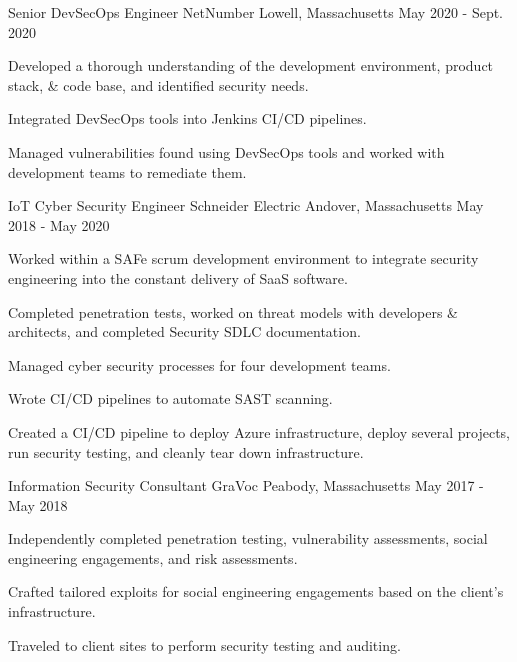 \begin{cventries}
  \cventry
    {Senior DevSecOps Engineer} %
    {NetNumber} %
    {Lowell, Massachusetts} %
    {May 2020 - Sept. 2020} %
    {
      \begin{cvitems} %
        \item {
            Developed a thorough understanding of the development environment, product stack, \& code base, and identified security needs.
        }
        \item {
            Integrated DevSecOps tools into Jenkins CI/CD pipelines.
        }
        \item {
            Managed vulnerabilities found using DevSecOps tools and worked with development teams to remediate them.
        }
      \end{cvitems}
    }

  \cventry
    {IoT Cyber Security Engineer} %
    {Schneider Electric} %
    {Andover, Massachusetts} %
    {May 2018 - May 2020} %
    {
      \begin{cvitems} %
        \item {
            Worked within a SAFe scrum development environment to integrate security engineering into the constant delivery of SaaS software.
        }
        \item {
            Completed penetration tests, worked on threat models with developers \& architects, and completed Security SDLC documentation.
        }
        \item {
            Managed cyber security processes for four development teams.
        }
        \item {
            Wrote CI/CD pipelines to automate SAST scanning.
        }
        \item {
            Created a CI/CD pipeline to deploy Azure infrastructure, deploy several projects, run security testing, and cleanly tear down infrastructure.
        }
      \end{cvitems}
    }

  \cventry
    {Information Security Consultant} %
    {GraVoc} %
    {Peabody, Massachusetts} %
    {May 2017 - May 2018} %
    {
      \begin{cvitems} %
        \item {
            Independently completed penetration testing, vulnerability assessments, social engineering engagements, and risk assessments.
        }
        \item {
            Crafted tailored exploits for social engineering engagements based on the client's infrastructure.
        }
        \item {
            Traveled to client sites to perform security testing and auditing.
        }
      \end{cvitems}
    }


\end{cventries}
